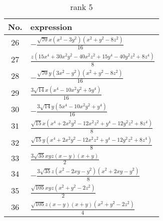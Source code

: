 \documentclass[fleqn,8pt,landscape]{jsarticle}
\begin{document}
\begin{table}[ht!]
\begin{center}
\caption{rank 5}
\renewcommand{\arraystretch}{1.3}
\begin{tabular}{cl} \hline \hline
No. & expression \\ \hline
$ 26 $ & $ - \frac{\sqrt{70} x \left(x^{2} - 3 y^{2}\right) \left(x^{2} + y^{2} - 8 z^{2}\right)}{16} $ \\
$ 27 $ & $ \frac{z \left(15 x^{4} + 30 x^{2} y^{2} - 40 x^{2} z^{2} + 15 y^{4} - 40 y^{2} z^{2} + 8 z^{4}\right)}{8} $ \\
$ 28 $ & $ - \frac{\sqrt{70} y \left(3 x^{2} - y^{2}\right) \left(x^{2} + y^{2} - 8 z^{2}\right)}{16} $ \\
$ 29 $ & $ \frac{3 \sqrt{14} x \left(x^{4} - 10 x^{2} y^{2} + 5 y^{4}\right)}{16} $ \\
$ 30 $ & $ - \frac{3 \sqrt{14} y \left(5 x^{4} - 10 x^{2} y^{2} + y^{4}\right)}{16} $ \\
$ 31 $ & $ \frac{\sqrt{15} x \left(x^{4} + 2 x^{2} y^{2} - 12 x^{2} z^{2} + y^{4} - 12 y^{2} z^{2} + 8 z^{4}\right)}{8} $ \\
$ 32 $ & $ \frac{\sqrt{15} y \left(x^{4} + 2 x^{2} y^{2} - 12 x^{2} z^{2} + y^{4} - 12 y^{2} z^{2} + 8 z^{4}\right)}{8} $ \\
$ 33 $ & $ \frac{3 \sqrt{35} x y z \left(x - y\right) \left(x + y\right)}{2} $ \\
$ 34 $ & $ - \frac{3 \sqrt{35} z \left(x^{2} - 2 x y - y^{2}\right) \left(x^{2} + 2 x y - y^{2}\right)}{8} $ \\
$ 35 $ & $ \frac{\sqrt{105} x y z \left(x^{2} + y^{2} - 2 z^{2}\right)}{2} $ \\
$ 36 $ & $ \frac{\sqrt{105} z \left(x - y\right) \left(x + y\right) \left(x^{2} + y^{2} - 2 z^{2}\right)}{4} $ \\
 \hline \hline
\end{tabular}
\end{center}
\end{table}
\end{document}
